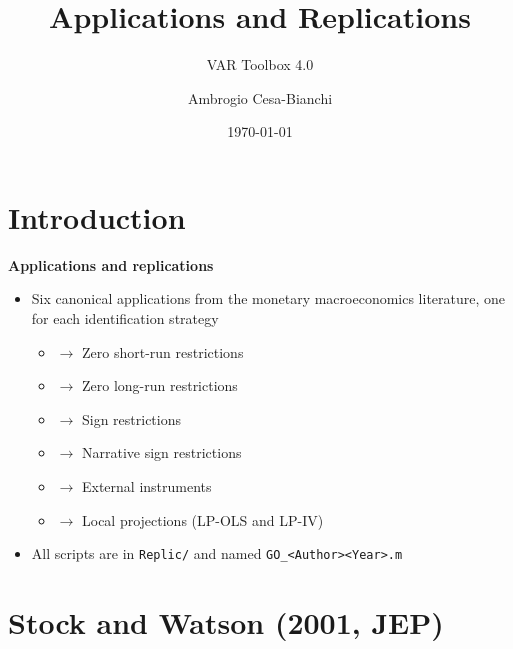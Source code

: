 \documentclass[10pt,handout]{beamer}
\title[VAR models]{\textbf{Applications and Replications}}
\subtitle{VAR Toolbox 4.0}
\author[]{Ambrogio Cesa-Bianchi}
\date{\today}
\begin{document}
\section{Introduction}

\begin{frame}[plain]
\titlepage
\end{frame}


\begin{frame}
{\textbf{Applications and replications}}
\begin{itemize}
\item Six canonical applications from the monetary macroeconomics literature, one for each identification strategy\smallskip
\begin{itemize}
\item \cite{StockWatson2001} $\longrightarrow$ Zero short-run restrictions\medskip
\item \cite{BlanchardQuah1989} $\longrightarrow$ Zero long-run restrictions\medskip
\item \cite{Uhlig2005} $\longrightarrow$ Sign restrictions\medskip
\item \cite{AntolinDiazRubioRamirez2018} $\longrightarrow$ Narrative sign restrictions\medskip
\item \cite{GertlerKaradi2015} $\longrightarrow$ External instruments\medskip
\item \cite{JordaTaylor2025} $\longrightarrow$ Local projections (LP-OLS and LP-IV)\bigskip
\end{itemize}
\item All scripts are in \texttt{Replic/} and named \texttt{GO\_<Author><Year>.m}
\end{itemize}
\end{frame}

\section[SW (2001)]{Stock and Watson (2001, JEP)}

\begin{frame}
\color{title} \par\bigskip
\color{note}
\end{frame}
\end{document}
